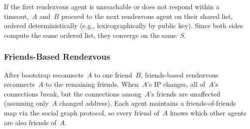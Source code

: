 If the first rendezvous agent is unreachable or does not respond within a timeout,~$A$ and~$B$ proceed to the next rendezvous agent on their shared list, ordered deterministically (e.g., lexicographically by public key).  Since both sides compute the same ordered list, they converge on the same~$S$.

\subsubsection{Friends-Based Rendezvous}
\label{sec:friends-rv-protocol}

After bootstrap reconnects~$A$ to one friend~$B$, friends-based rendezvous reconnects~$A$ to the remaining friends.  When~$A$'s IP changes, all of~$A$'s connections break, but the connections among~$A$'s friends are unaffected (assuming only~$A$ changed address).  Each agent maintains a friends-of-friends map via the social graph protocol, so every friend of~$A$ knows which other agents are also friends of~$A$.

